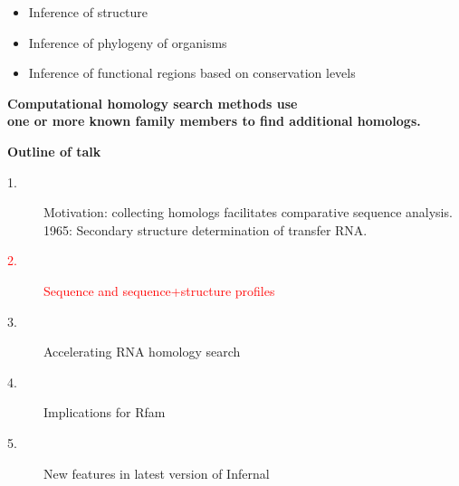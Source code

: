 \documentclass[landscape]{slides}
\begin{document}
\begin{slide}


\begin{itemize}
\item Inference of  structure
\item Inference of phylogeny of organisms
\item Inference of functional regions based on conservation levels
\end{itemize}

\medskip
\medskip
\normalsize
\begin{center}
\textbf{Computational homology search methods use \\ one or more known
family members to find additional homologs.}
\end{center}

\vfill
\end{slide}
\begin{slide}
\begin{center}
\textbf{Outline of talk}

\begin{description}
\item[1.] Motivation: collecting homologs facilitates comparative
  sequence analysis.\\ 1965: Secondary structure determination of
  transfer RNA.
\item[\textcolor{red}{2.}] \textcolor{red}{Sequence and sequence+structure profiles}
\item[3.] Accelerating RNA homology search
\item[4.] Implications for Rfam
\item[5.] New features in latest version of Infernal
\end{description}

\end{center}
\vfill
\end{slide}
\end{document}
